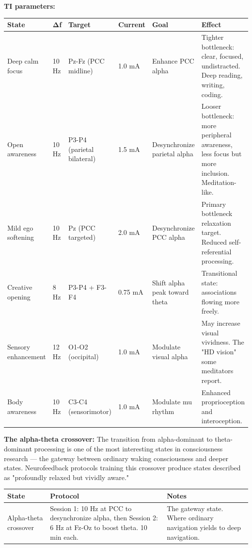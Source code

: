 \textbf{TI parameters:}



\begin{longtable}{p{} p{} p{} p{} p{} p{}}
\toprule
\textbf{State} & \textbf{Δf} & \textbf{Target} & \textbf{Current} & \textbf{Goal} & \textbf{Effect} \\
\midrule
\endhead
Deep calm focus & 10 Hz & Pz-Fz (PCC midline) & 1.0 mA & Enhance PCC alpha & Tighter bottleneck: clear, focused, undistracted. Deep reading, writing, coding. \\
Open awareness & 10 Hz & P3-P4 (parietal bilateral) & 1.5 mA & Desynchronize parietal alpha & Looser bottleneck: more peripheral awareness, less focus but more inclusion. Meditation-like. \\
Mild ego softening & 10 Hz & Pz (PCC targeted) & 2.0 mA & Desynchronize PCC alpha & Primary bottleneck relaxation target. Reduced self-referential processing. \\
Creative opening & 8 Hz & P3-P4 + F3-F4 & 0.75 mA & Shift alpha peak toward theta & Transitional state: associations flowing more freely. \\
Sensory enhancement & 12 Hz & O1-O2 (occipital) & 1.0 mA & Modulate visual alpha & May increase visual vividness. The "HD vision" some meditators report. \\
Body awareness & 10 Hz & C3-C4 (sensorimotor) & 1.0 mA & Modulate mu rhythm & Enhanced proprioception and interoception. \\
\bottomrule
\end{longtable}



\textbf{The alpha-theta crossover:} The transition from alpha-dominant to theta-dominant processing is one of the most interesting states in consciousness research — the gateway between ordinary waking consciousness and deeper states. Neurofeedback protocols training this crossover produce states described as "profoundly relaxed but vividly aware."



\begin{longtable}{p{} p{} p{}}
\toprule
\textbf{State} & \textbf{Protocol} & \textbf{Notes} \\
\midrule
\endhead
Alpha-theta crossover & Session 1: 10 Hz at PCC to desynchronize alpha, then Session 2: 6 Hz at Fz-Oz to boost theta. 10 min each. & The gateway state. Where ordinary navigation yields to deep navigation. \\
\bottomrule
\end{longtable}



